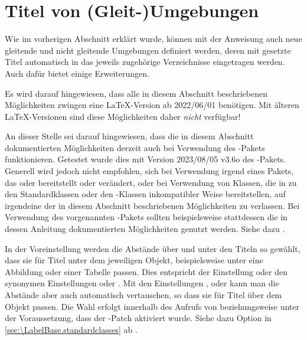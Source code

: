\section{Titel von (Gleit-)Umgebungen}

Wie im vorherigen Abschnitt erklärt
wurde, können mit der Anweisung  auch
neue gleitende und nicht gleitende Umgebungen definiert werden, deren mit
 gesetzte Titel automatisch in das jeweils
zugehörige Verzeichnisse eingetragen werden. Auch dafür bietet
 einige Erweiterungen.

Es wird darauf hingewiesen, dass alle in diesem Abschnitt
beschriebenen Möglichkeiten zwingen eine \LaTeX-Version ab 2022/06/01 benötigen. Mit älteren \LaTeX-Versionen sind diese
Möglichkeiten daher \emph{nicht} verfügbar!

%
An dieser Stelle sei darauf hingewiesen, dass die in diesem Abschnitt
dokumentierten Möglichkeiten derzeit auch bei Verwendung des
-Pakets funktionieren. Getestet wurde dies mit Version
2023/08/05 v3.6o des -Pakets. Generell wird jedoch nicht
empfohlen, sich bei Verwendung irgend eines Pakets, das
 oder 
bereitstellt oder verändert, oder bei Verwendung von Klassen, die
 in zu den Standardklassen oder den
\KOMAScript-Klassen inkompatibler Weise bereitstellen, auf irgendeine der in
diesem Abschnitt beschriebenen Möglichkeiten zu verlassen. Bei Verwendung des
vorgenannten -Pakets sollten beispielsweise stattdessen die in
dessen Anleitung dokumentierten Möglichkeiten genutzt werden. Siehe dazu
\cite{package:caption}.

\begin{Declaration}
\end{Declaration}
In der Voreinstellung werden die Abstände über und unter den Titeln so
gewählt, dass sie für Titel unter dem jeweiligen
Objekt, beispielsweise unter eine Abbildung oder einer Tabelle passen. Dies
entspricht der Einstellung  oder den
synonymen Einstellungen 
oder . Mit den Einstellungen
,  oder
 kann man die Abstände aber auch automatisch
vertauschen, so dass sie für Titel über dem Objekt passen. Die Wahl erfolgt
innerhalb des Aufrufs von  beziehungsweise
 unter der Voraussetzung, dass der
-Patch aktiviert wurde. Siehe dazu Option
%
%
 in
\autoref{sec:\LabelBase.standardclasses} ab
.

